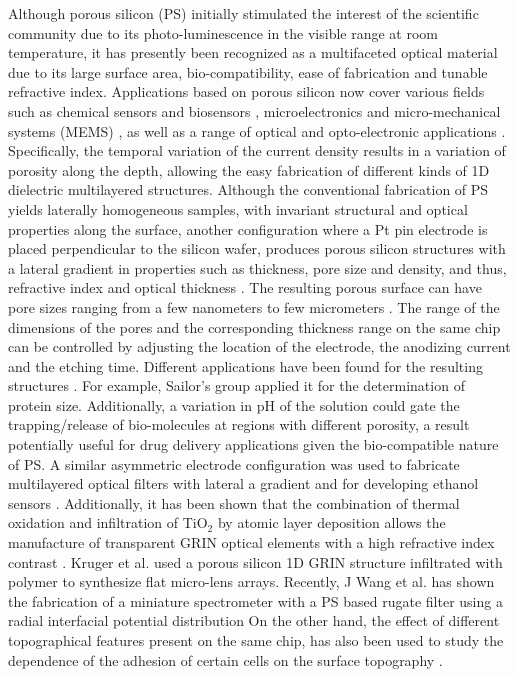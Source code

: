 \documentclass[review,sort&compress]{cas-sc}
\begin{document}
Although porous silicon (PS) initially stimulated the interest of the scientific
community due to its photo-luminescence in the visible range at room
temperature, it has presently
been recognized as a multifaceted optical material due to its large surface
area, bio-compatibility, ease of fabrication and tunable refractive index.
Applications based on porous silicon now cover various fields such as
chemical sensors and biosensors \cite{kumar2020porous,lin_porous_1997,dancil_porous_1999},
microelectronics and micro-mechanical systems (MEMS)
\cite{martinez2016dual}, as well as a
range of optical \cite{estevez2014porous} and opto-electronic applications
\cite{ramadan2020fabrication,namavar_optoelectronic_1993,galkin_mechanisms_2017,gelloz_electroluminescence_2018}. Specifically,
the temporal variation of the current density results in a variation of
porosity along the depth, allowing the easy fabrication of different kinds
\cite{perez2018reflectivity,ariza-flores_white_2012,ghulinyan_porous_2003,girault_porous_2017}
of 1D dielectric multilayered structures.
Although the conventional fabrication of PS yields laterally
homogeneous samples, with invariant structural and optical properties
along the surface, another configuration where a Pt pin electrode is placed
perpendicular to the silicon wafer, produces porous
silicon structures with a lateral gradient in properties such as
thickness, pore size and density, and thus, refractive index and
optical thickness \cite{khung2008using, clements2011mesenchymal}.
The resulting porous surface can have pore sizes ranging from a few nanometers
to  few micrometers  \cite{canham_routes_2018}. The range of the dimensions of the pores and
the corresponding  thickness range on the same chip can be controlled by
adjusting the location of the electrode, the  anodizing current
and the etching time. Different
applications have been found for the resulting structures
\cite{collins2002determining}. For example, Sailor's group
\cite{sailor2012porous, collins2002determining} applied it
for the determination of protein size.
Additionally, a variation in pH of the solution could gate the
trapping/release of bio-molecules at regions with different porosity, a
result potentially useful for drug delivery
applications given the bio-compatible nature of PS.
A similar asymmetric electrode configuration was used to fabricate
multilayered optical filters with lateral a gradient
\cite{li2005painting} and
for developing ethanol sensors \cite{sailor2012porous}.
Additionally, it has been shown that the combination of thermal  oxidation  and
infiltration of TiO$_2$  by atomic layer deposition allows the manufacture
of transparent GRIN
optical elements with a high refractive index contrast \cite{ocier2017tunable}.
Kruger et al. \cite{krueger2018electrochemical} used
a porous silicon 1D GRIN structure infiltrated with polymer to
synthesize flat micro-lens arrays.
Recently, J Wang et al. has shown the fabrication of
a miniature spectrometer with a PS based rugate filter using a
radial interfacial potential distribution \cite{wang2019fabrication}
On the other hand, the effect of different topographical
features present on the same chip, has also been
used to study the dependence of the adhesion of certain cells on the
surface topography \cite{khung2008using}.
\end{document}
